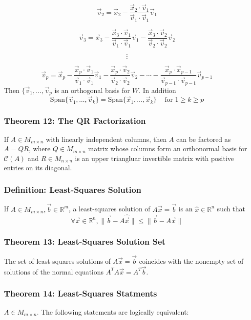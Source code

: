 \documentclass{article}
\begin{document}
$$\vec v_2 = \vec x_2 - \frac{\vec x_2 \cdot \vec v_1}{\vec v_1 \cdot \vec v_1} \vec v_1$$

$$\vec v_3 = \vec x_3 - \frac{\vec x_3 \cdot \vec v_1}{\vec v_1 \cdot \vec v_1} \vec v_1 -\frac{\vec x_3 \cdot \vec v_2}{\vec v_2 \cdot \vec v_2} \vec v_2$$

$$\vdots$$

$$\vec v_p = \vec x_p - \frac{\vec x_p \cdot \vec v_1}{\vec v_1 \cdot \vec v_1} \vec v_1 -\frac{\vec x_p \cdot \vec v_2}{\vec v_2 \cdot \vec v_2} \vec v_2 - \cdots - \frac{\vec x_p \cdot \vec x_{p-1}}{\vec v_{p-1} \cdot \vec v_{p-1}} \vec v_{p-1}$$
Then $\{ \vec v_1 , \dots , \vec v_p$ is an orthogonal basis for $W$. In addition
$$\text{Span}\{\vec v_1 , \dots , \vec v_k \} =\text{Span}\{\vec x_1 , \dots , \vec x_k \} \hspace{10pt} \text{ for } 1 \geq k \geq p$$

\subsubsection*{Theorem 12: The QR Factorization}
If $A \in M _{m \times n}$ with linearly independent columns, then $A$ can be factored as $A = QR$, where $Q \in M_{m \times n}$ matrix whose columns form an orthonormal basis for $\mathcal C (A)$ and $R \in M_{n \times n}$ is an upper triangluar invertible matrix with positive entries on its diagonal. 

\subsubsection*{Definition: Least-Squares Solution}
If $A \in M_{m \times n}, \vec b \in \mathbb R^m$, a least-squares solution of $A \vec x = \vec b$ is an $\hat x \in \mathbb R^n$ such that
$$\forall \vec x \in \mathbb R^n, \|\vec b - A \hat \vec x \| \leq \| \vec b - A \vec x \|$$

\subsubsection*{Theorem 13: Least-Squares Solution Set}
The set of least-squares solutions of $A \vec x = \vec b$ coincides with the nonempty set of solutions of the normal equations $A ^T A \vec x = A^T \vec b$.

\subsubsection*{Theorem 14: Least-Squares Statments}
$A \in M_{m \times n}$. The following statements are logically equivalent:
\end{document}
